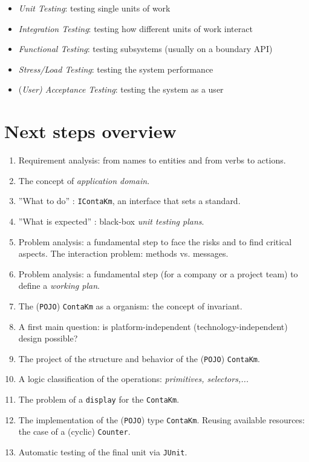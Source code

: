 \documentclass{llncs}
\newcommand{\pojo}{\texttt{POJO}}
\newcommand{\junit}{\texttt{JUnit}}
\newcommand{\labelsec}[1]{\label{sec:#1}}
\begin{document}
\begin{itemize}
  \item \emph{Unit Testing}: testing single units of work
  \item \emph{Integration Testing}: testing how different units of work interact
  \item \emph{Functional Testing}: testing subsystems (usually on a boundary API)
  \item \emph{Stress/Load Testing}: testing the system performance
  \item (\emph{User) Acceptance Testing}: testing the system as a user
\end{itemize}


\section{Next steps overview}
\labelsec{next}
\begin{enumerate}
  \item Requirement analysis: from names to entities and from verbs to actions.
  \item The concept of \emph{application domain}.
  \item ''What to do'' :  \texttt{IContaKm}, an interface that sets a standard.
  \item ''What is expected'' : black-box  \emph{unit testing plans}.
  \item Problem analysis: a fundamental step to face the risks and to find critical aspects. The interaction problem: methods vs. messages.
  \item Problem analysis: a fundamental step (for a company or a project team) to define a \emph{working plan}.
  \item The (\pojo) \texttt{ContaKm} as a organism: the concept of invariant.
  \item A first main question: is platform-independent (technology-independent) design possible?
  \item The project of the structure and behavior of the (\pojo) \texttt{ContaKm}.
   \item A logic classification of the operations: \emph{primitives, selectors,...}
  \item The problem of a \texttt{display} for the \texttt{ContaKm}.
  \item The implementation of the (\pojo) type \texttt{ContaKm}. Reusing available resources: the case of a (cyclic) \texttt{Counter}.
  \item Automatic testing of the final unit via \junit.
\end{enumerate}


\appendix




\end{document}
